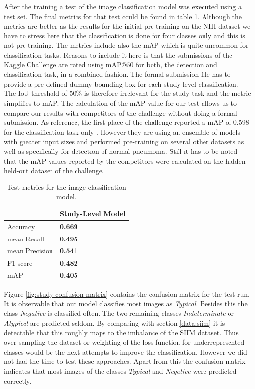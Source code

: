 After the training a test of the image classification model was executed using a test set. The final metrics for that test could be found in table \ref{table:study-results}. Although the metrics are better as the results for the initial pre-training on the NIH dataset we have to stress here that the classification is done for four classes only and this is not pre-training. The metrics include also the \ac{mAP} which is quite uncommon for classification tasks. Reasons to include it here is that the submissions of the Kaggle Challenge are rated using \ac{mAP}@50 for both, the detection and classification task, in a combined fashion. The formal submission file has to provide a pre-defined dummy bounding box for each study-level classification. The \ac{IoU} threshold of 50\% is therefore irrelevant for the study task and the metric simplifies to \ac{mAP}. The calculation of the \ac{mAP} value for our test allows us to compare our results with competitors of the challenge without doing a formal submission. As reference, the first place of the challenge reported a \ac{mAP} of 0.598 for the classification task only \autocite{SIIMFirstPlace}. However they are using an ensemble of models with greater input sizes and performed pre-training on several other datasets as well as specifically for detection of normal pneumonia. Still it has to be noted that the \ac{mAP} values reported by the competitors were calculated on the hidden held-out dataset of the challenge.

\begin{table}
	\begin{tabular}{l|l}
		&    Study-Level Model  \\ \hline
		Accuracy 		& \textbf{0.669} \\
		mean Recall		& \textbf{0.495} \\
		mean Precision	& \textbf{0.541} \\
		F1-score		& \textbf{0.482} \\
		mAP 	    	& \textbf{0.405} \\
	\end{tabular}
	\centering
	\caption{Test metrics for the image classification model.}
	\label{table:study-results}
\end{table}

Figure \ref{fig:study-confusion-matrix} contains the confusion matrix for the test run. It is observable that our model classifies most images as \textit{Typical}. Besides this the class \textit{Negative} is classified often. The two remaining classes \textit{Indeterminate} or \textit{Atypical} are predicted seldom. By comparing with section \ref{data:siim} it is detectable that this roughly maps to the imbalance of the SIIM dataset. Thus over sampling the dataset or weighting of the loss function for underrepresented classes would be the next attempts to improve the classification. However we did not had the time to test these approaches. Apart from this the confusion matrix indicates that most images of the classes \textit{Typical} and \textit{Negative} were predicted correctly.

